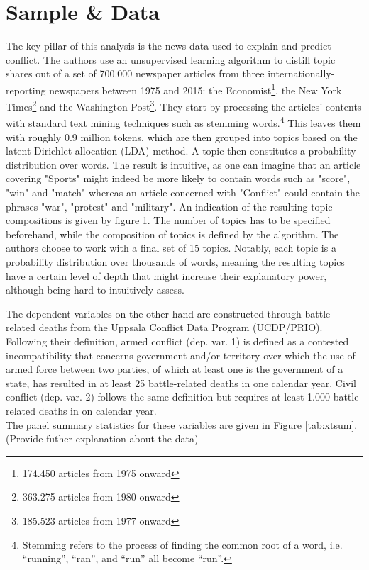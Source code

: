 \section{Sample \& Data}
The key pillar of this analysis is the news data used to explain and predict conflict.
The authors use an unsupervised learning algorithm to distill topic shares out of a set of 700.000 newspaper articles from three internationally-reporting newspapers between 1975 and 2015: the Economist\footnote{174.450 articles from 1975 onward}, the New York Times\footnote{363.275 articles from 1980 onward} and the Washington Post\footnote{185.523 articles from 1977 onward}.
They start by processing the articles' contents with standard text mining techniques such as stemming words.\footnote{Stemming refers to the process of finding the common root of a word, i.e. “running”, “ran”, and “run” all become “run”.}
This leaves them with roughly 0.9 million tokens, which are then grouped into topics based on the latent Dirichlet allocation (LDA) method.
A topic then constitutes a probability distribution over words.
The result is intuitive, as one can imagine that an article covering "Sports" might indeed be more likely to contain words such as "score", "win" and "match" whereas an article concerned with "Conflict" could contain the phrases "war", "protest" and "military".
An indication of the resulting topic compositions is given by figure \ref{}.
The number of topics has to be specified beforehand, while the composition of topics is defined by the algorithm.
The authors choose to work with a final set of 15 topics.
Notably, each topic is a probability distribution over thousands of words, meaning the resulting topics have a certain level of depth that might increase their explanatory power, although being hard to intuitively assess.

The dependent variables on the other hand are constructed through battle-related deaths from the Uppsala Conflict Data Program (UCDP/PRIO).
Following their definition, armed conflict (dep. var. 1) is defined as a contested incompatibility that concerns government and/or territory over which the use of armed force between two parties, of which at least one is the government of a state, has resulted in at least 25 battle-related deaths in one calendar year.
Civil conflict (dep. var. 2) follows the same definition but requires at least 1.000 battle-related deaths in on calendar year. \\

The panel summary statistics for these variables are given in Figure \ref{tab:xtsum}. (Provide futher explanation about the data)

